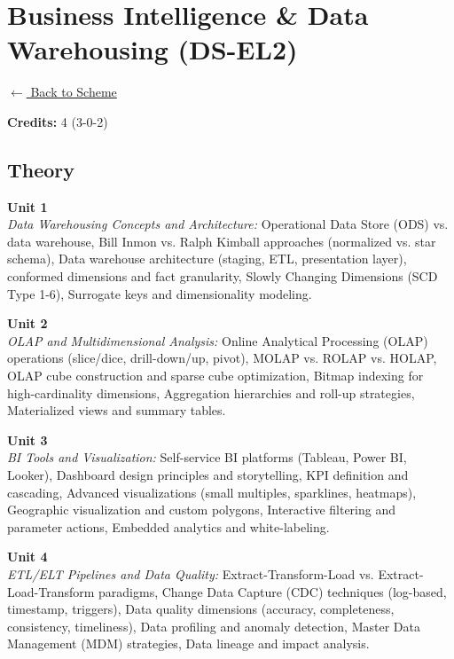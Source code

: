 \section*{Business Intelligence \& Data Warehousing (DS-EL2)}
\label{elec:DS_2}

\noindent \small{\hyperref[main:scheme]{$\leftarrow$ Back to Scheme}} \vspace{0.5cm}

\noindent \textbf{Credits:} 4 (3-0-2)

\subsection*{Theory}
\noindent\textbf{Unit 1} \\
\textit{Data Warehousing Concepts and Architecture:} Operational Data Store (ODS) vs. data warehouse, Bill Inmon vs. Ralph Kimball approaches (normalized vs. star schema), Data warehouse architecture (staging, ETL, presentation layer), conformed dimensions and fact granularity, Slowly Changing Dimensions (SCD Type 1-6), Surrogate keys and dimensionality modeling.

\vspace{0.3cm}

\noindent\textbf{Unit 2} \\
\textit{OLAP and Multidimensional Analysis:} Online Analytical Processing (OLAP) operations (slice/dice, drill-down/up, pivot), MOLAP vs. ROLAP vs. HOLAP, OLAP cube construction and sparse cube optimization, Bitmap indexing for high-cardinality dimensions, Aggregation hierarchies and roll-up strategies, Materialized views and summary tables.

\vspace{0.3cm}

\noindent\textbf{Unit 3} \\
\textit{BI Tools and Visualization:} Self-service BI platforms (Tableau, Power BI, Looker), Dashboard design principles and storytelling, KPI definition and cascading, Advanced visualizations (small multiples, sparklines, heatmaps), Geographic visualization and custom polygons, Interactive filtering and parameter actions, Embedded analytics and white-labeling.

\vspace{0.3cm}

\noindent\textbf{Unit 4} \\
\textit{ETL/ELT Pipelines and Data Quality:} Extract-Transform-Load vs. Extract-Load-Transform paradigms, Change Data Capture (CDC) techniques (log-based, timestamp, triggers), Data quality dimensions (accuracy, completeness, consistency, timeliness), Data profiling and anomaly detection, Master Data Management (MDM) strategies, Data lineage and impact analysis.


